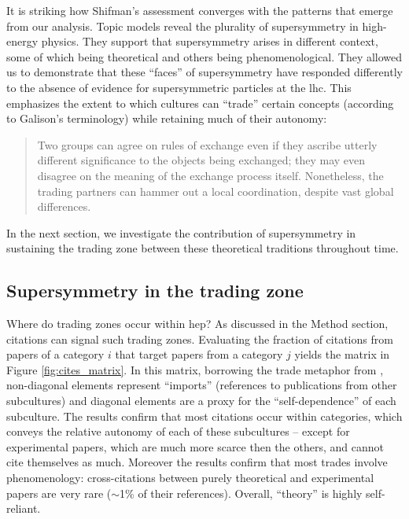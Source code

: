 \documentclass[smallextended]{svjour3}
\begin{document}
It is striking how Shifman's assessment converges with the patterns that emerge from our analysis. Topic models reveal the plurality of supersymmetry in high-energy physics. They support that supersymmetry arises in different context, some of which being theoretical and others being phenomenological. They allowed us to demonstrate that these ``faces'' of supersymmetry have responded differently to the absence of evidence for supersymmetric particles at the \gls{lhc}. This emphasizes the extent to which cultures can ``trade'' certain concepts (according to Galison's terminology) while retaining much of their autonomy:


\begin{quote}
    Two groups can agree on rules of exchange even if they ascribe utterly different significance to the objects being exchanged; they may even disagree on the meaning of the exchange process itself. Nonetheless, the trading partners can hammer out a local coordination, despite vast global differences. \citep[p.~783]{galison1997image}
\end{quote}

In the next section, we investigate the contribution of supersymmetry in sustaining the trading zone between these theoretical traditions throughout time.

\subsection{Supersymmetry in the trading zone}

Where do trading zones occur within \gls{hep}? As discussed in the Method section, citations can signal such trading zones. Evaluating the fraction of citations from papers of a category $i$ that target papers from a category $j$ yields the matrix in Figure \ref{fig:cites_matrix}. In this matrix, borrowing the trade metaphor from \citet{Yan2013}, non-diagonal elements represent ``imports'' (references to publications from other subcultures) and diagonal elements are a proxy for the ``self-dependence'' of each subculture. The results confirm that most citations occur within categories, which conveys the relative autonomy of each of these subcultures -- except for experimental papers, which are much more scarce then the others, and cannot cite themselves as much. Moreover the results confirm that most trades involve phenomenology: cross-citations between purely theoretical and experimental papers are very rare ($\sim$1\% of their references). Overall, ``theory'' is highly self-reliant.
\end{document}
